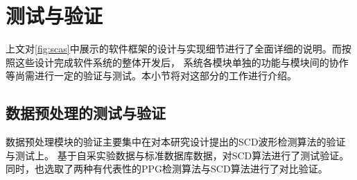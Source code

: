 

\section{测试与验证}
上文对\autoref{fig:scas}中展示的软件框架的设计与实现细节进行了全面详细的说明。而按照这些设计完成软件系统的整体开发后，
系统各模块单独的功能与模块间的协作等尚需进行一定的验证与测试。本小节将对这部分的工作进行介绍。

\subsection{数据预处理的测试与验证}
数据预处理模块的验证主要集中在对本研究设计提出的SCD波形检测算法的验证与测试上。
基于自采实验数据与标准数据库数据，对SCD算法进行了测试验证。同时，也选取了两种有代表性的PPG检测算法与SCD算法进行了对比验证。

